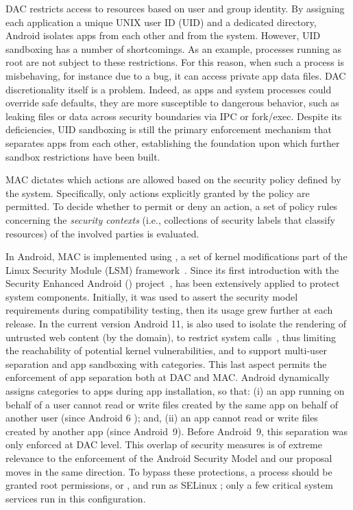 DAC restricts access to resources based on user and group identity.
By assigning each application a unique UNIX user ID (UID) and a
dedicated directory, Android isolates apps from each other and from
the system.  However, UID sandboxing has a number of shortcomings.  As
an example, processes running as root are not subject to these
restrictions.  For this reason, when such a process is misbehaving,
for instance due to a bug, it can access private app data files.  DAC
discretionality itself is a problem.  Indeed, as apps and system
processes could override safe defaults, they are more susceptible to
dangerous behavior, such as leaking files or data across security
boundaries via IPC or fork/exec.  Despite its deficiencies, UID
sandboxing is still the primary enforcement mechanism that separates
apps from each other, establishing the foundation upon which further
sandbox restrictions have been built.

MAC dictates which actions are allowed based on the security policy
defined by the system.  Specifically, only actions explicitly granted
by the policy are permitted.  To decide whether to permit or deny an
action, a set of policy rules concerning the {\em security contexts}
(i.e., collections of security labels that classify resources) of the
involved parties is evaluated.

In Android, MAC is implemented using \sea, a set of kernel
modifications part of the Linux Security Module (LSM)
framework~\cite{lsm_fra}.  Since its first introduction with the
Security Enhanced Android (\sea) project~\cite{seapp_seandroid}, \sel
has been extensively applied to protect system components.  Initially,
it was used to assert the security model requirements during
compatibility testing, then its usage grew further at each release.
In the current version Android 11, \sel is also used to isolate the
rendering of untrusted web content (by the \isolatedapp domain), to
restrict \ioctl system calls~\cite{seapp_restrioctly}, thus limiting
the reachability of potential kernel vulnerabilities, and to support
multi-user separation and app sandboxing with \sel categories.  This
last aspect permits the enforcement of app separation both at DAC and MAC.
Android dynamically assigns categories to apps during app
installation, so that: (i) an app running on behalf of a user cannot
read or write files created by the same app on behalf of another user
(since Android 6 \cite{seapp_android6_per_user}); and, (ii) an app
cannot read or write files created by another app (since
Android~9\cite{seapp_android9_per_app}).  Before Android~9, this
separation was only enforced at DAC level.  This overlap of security
measures is of extreme relevance to the enforcement of the Android
Security Model and our proposal moves in the same direction.  To
bypass these protections, a process should be granted root
permissions, \dacoverride or \dacreadsearch, and run as SELinux
\mlstrustedsubject; only a few critical system services run in this
configuration.

